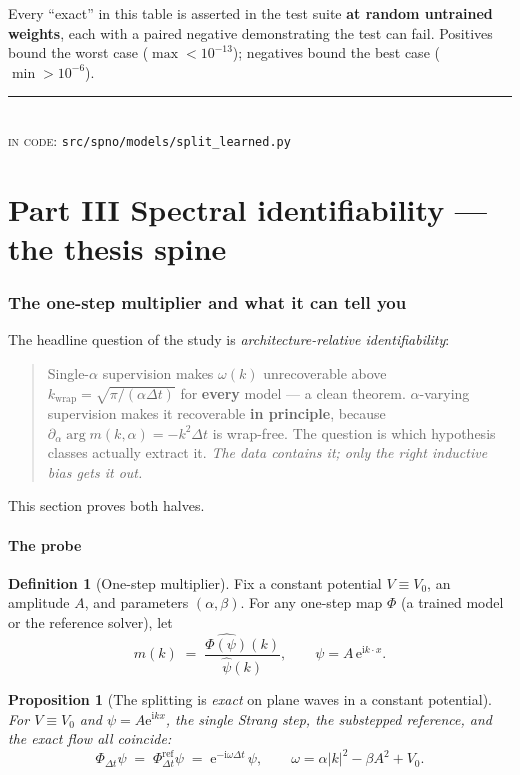 \documentclass[11pt,a4paper]{article}
\theoremstyle{plain}
\newtheorem{proposition}[theorem]{Proposition}
\theoremstyle{definition}
\newtheorem{definition}[theorem]{Definition}
\theoremstyle{remark}
\newcommand{\iu}{\mathrm{i}}
\newcommand{\eu}{\mathrm{e}}
\newcommand{\dt}{\Delta t}
\newcommand{\kwrap}{k_{\mathrm{wrap}}}
\newcommand{\Flow}{\Phi}
\newcommand{\src}[1]{{\color{linknavy}\texttt{\footnotesize #1}}}
\newcommand{\sourcenote}[1]{%
  \par\vspace{0.35em}\noindent
  {\footnotesize\color{rulegray}\rule{\linewidth}{0.4pt}\\[0.25em]
  \textsc{in code:} \src{#1}}\par\vspace{0.5em}}
\begin{document}
Every ``exact'' in this table is asserted in the test suite \textbf{at random untrained
weights}, each with a paired negative demonstrating the test can fail. Positives bound the
worst case ($\max < 10^{-13}$); negatives bound the best case ($\min > 10^{-6}$).

\sourcenote{src/spno/models/split\_learned.py}
\newpage
\part*{Part III \quad Spectral identifiability --- the thesis spine}

\section{The one-step multiplier and what it can tell you}
\label{sec:identifiability}

The headline question of the study is \emph{architecture-relative identifiability}:

\begin{quote}
Single-$\alpha$ supervision makes $\omega(k)$ unrecoverable above
$\kwrap = \sqrt{\pi/(\alpha\dt)}$ for \textbf{every} model --- a clean theorem.
$\alpha$-varying supervision makes it recoverable \textbf{in principle}, because
$\partial_\alpha\arg m(k,\alpha) = -k^2\dt$ is wrap-free. The question is which hypothesis
classes actually extract it. \emph{The data contains it; only the right inductive bias
gets it out.}
\end{quote}

This section proves both halves.

\subsection{The probe}

\begin{definition}[One-step multiplier]
\label{def:multiplier}
Fix a constant potential $V\equiv V_0$, an amplitude $A$, and parameters $(\alpha,\beta)$.
For any one-step map $\Flow$ (a trained model or the reference solver), let
\[
m(k) \;=\; \frac{\widehat{\Flow(\psi)}(k)}{\widehat{\psi}(k)},
\qquad \psi = A\,\eu^{\iu k\cdot x}.
\]
\end{definition}

\begin{proposition}[The splitting is \emph{exact} on plane waves in a constant potential]
\label{prop:strangexactpw}
For $V\equiv V_0$ and $\psi = A\eu^{\iu kx}$, the single Strang step, the substepped
reference, and the exact flow all coincide:
\[
\Flow_{\dt}\psi \;=\; \Flow^{\mathrm{ref}}_{\dt}\psi \;=\; \eu^{-\iu\omega\dt}\,\psi,
\qquad \omega = \alpha|k|^2 - \beta A^2 + V_0 .
\]
\end{proposition}
\end{document}
